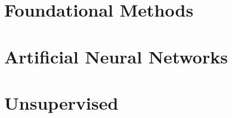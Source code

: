 \chapter{Foundational Methods}

















\chapter{Artificial Neural Networks}








\chapter{Unsupervised}






